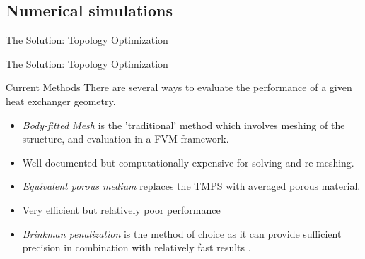 \documentclass{beamer}
\begin{document}
	\subsection{Numerical simulations}
	\begin{frame}{The Solution: Topology Optimization}
		\centering
	\end{frame}
		\begin{frame}{The Solution: Topology Optimization}
		\centering
	\end{frame}
	\begin{frame}{Current Methods}
		There are several ways to evaluate the performance of a given heat exchanger geometry. 
		\begin{itemize}
			\item \emph{Body-fitted Mesh} is the 'traditional' method which involves meshing of the structure, and evaluation in a FVM framework. 
			\item[-] Well documented but computationally expensive for solving and re-meshing. 
			\pause
			\item \emph{Equivalent porous medium} replaces the TMPS with averaged porous material. 
			\item[-] Very efficient but relatively poor performance \cite{art:porous}
			\pause
			\item \emph{Brinkman penalization} is the method of choice as it can provide sufficient precision in combination with relatively fast results \cite{art:TPMS}. 
		\end{itemize}
	\end{frame}
\end{document}
